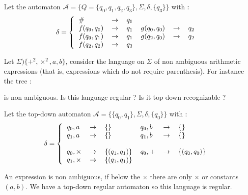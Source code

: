 \documentclass{article}
\theoremstyle{plain}
\begin{document}
  \begin{correction}{}{}
    Let the automaton
    $\mathcal A = \{Q=\{q_0, q_1, q_2, q_3\}, \Sigma, \delta, \{q_3\}\}$ with :
    \[
      \delta = \left \{
        \begin{tabular}{l l r l l l r l}
          $\#$          & $\to$ & $q_0$ \\
          $f(q_0, q_0)$ & $\to$ & $q_1$ & $g(q_0, q_0)$ & $\to$ & $q_2$ \\
          $f(q_0, q_1)$ & $\to$ & $q_1$ & $g(q_2, q_0)$ & $\to$ & $q_2$ \\
          $f(q_2, q_2)$ & $\to$ & $q_3$ \\
        \end{tabular}
        \right.
    \]
  \end{correction}

  \exercice Let $\Sigma ) \{+^2, \times^2, a, b\}$, consider the language on
  $\Sigma$ of non ambiguous arithmetic expressions (that is, expressions which
  do not require parenthesis). For instance the tree :

  \begin{center}
  \end{center}

  is non ambiguous. Is this language regular ? Is it top-down recognizable ?

  \begin{correction}{}{}
    Let the top-down automaton $\mathcal A = \{\{q_0, q_1\}, \Sigma, \delta,
    \{q_0\}\}$ with :
    \[
      \delta = \left \{
        \begin{tabular}{l l l l l l}
          $q_0, a$ & $\to$ & $\{\}$ & $q_0, b$ & $\to$ & $\{\}$ \\
          $q_1, a$ & $\to$ & $\{\}$ & $q_1, b$ & $\to$ & $\{\}$ \\
          \\
          $q_0, \times$ & $\to$ & $\{(q_1, q_1)\}$ &
          $q_0, +$      & $\to$ & $\{(q_0, q_0)\}$ \\
          $q_1, \times$ & $\to$ & $\{(q_1, q_1)\}$ \\
        \end{tabular}
        \right.
    \]

    An expression is non ambiguous, if below the $\times$ there are only
    $\times$ or constants $(a, b)$. We have a top-down regular automaton so
    this language is regular.
  \end{correction}
\end{document}
